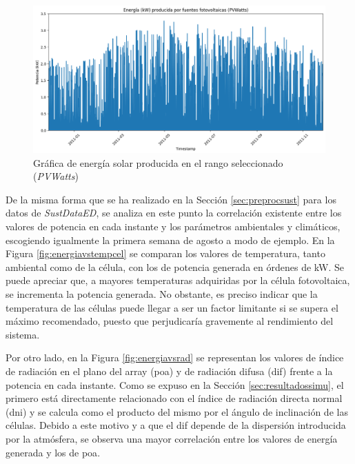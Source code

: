 \begin{figure}[H]
  \centering
  \includegraphics[width=1\textwidth]{img/diseno/matplotsolaryearpvwatts.png}
  \caption{Gráfica de energía solar producida en el rango seleccionado (\textit{PVWatts})}
  \label{fig:solaryearpv}
\end{figure}

\vspace{3mm}

De la misma forma que se ha realizado en la Sección \ref{sec:preprocsust} para los datos de \textit{SustDataED}, se analiza en este punto la correlación existente entre los valores de potencia en cada instante y los parámetros ambientales y climáticos, escogiendo igualmente la primera semana de agosto a modo de ejemplo. En la Figura \ref{fig:energiavstempcel} se comparan los valores de temperatura, tanto ambiental como de la célula, con los de potencia generada en órdenes de kW. Se puede apreciar que, a mayores temperaturas adquiridas por la célula fotovoltaica, se incrementa la potencia generada. No obstante, es preciso indicar que la temperatura de las células puede llegar a ser un factor limitante si se supera el máximo recomendado, puesto que perjudicaría gravemente al rendimiento del sistema.

\vspace{3mm}

Por otro lado, en la Figura \ref{fig:energiavsrad} se representan los valores de índice de radiación en el plano del array (\gls{poa}) y de radiación difusa (\gls{dif}) frente a la potencia en cada instante. Como se expuso en la Sección \ref{sec:resultadossimu}, el primero está directamente relacionado con el índice de radiación directa normal (\gls{dni}) y se calcula como el producto del mismo por el ángulo de inclinación de las células. Debido a este motivo y a que el \gls{dif} depende de la dispersión introducida por la atmósfera, se observa una mayor correlación entre los valores de energía generada y los de \gls{poa}.

